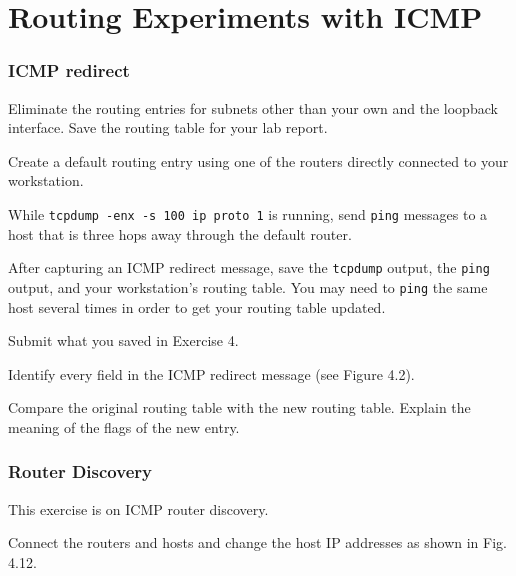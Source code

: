 \documentclass{../UTNetLab}
\begin{document}
\part{Routing Experiments with ICMP}
\section{ICMP redirect}
    Eliminate the routing entries for subnets other than your own and the loopback interface.
    Save the routing table for your lab report.

    Create a default routing entry using one of the routers directly connected to your workstation.

    While \lstinline{tcpdump -enx -s 100 ip proto 1} is running, send \lstinline{ping} messages to a host that is three hops away through the default router.

    After capturing an ICMP redirect message, save the \lstinline{tcpdump} output, the \lstinline{ping} output, and your workstation’s routing table.
    You may need to \lstinline{ping} the same host several times in order to get your routing table updated.
    
    \begin{report}
        \item Submit what you saved in Exercise 4.
        
        \item Identify every field in the ICMP redirect message (see Figure 4.2).
        
        \item Compare the original routing table with the new routing table. Explain the meaning of the flags of the new entry.
    \end{report}

\section{Router Discovery}
    This exercise is on ICMP router discovery.
    
    Connect the routers and hosts and change the host IP addresses as shown in Fig. 4.12.
\end{document}
